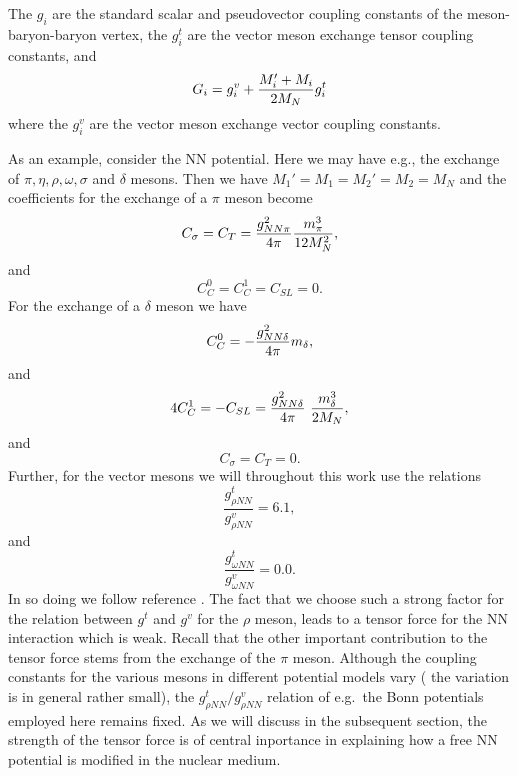 The $g_i$ are the standard scalar and pseudovector
coupling constants of the meson-baryon-baryon vertex, 
the $g^t_i$ are the vector meson exchange tensor
coupling constants, and
\begin{equation}
    G_i = g^v_i + {M'_i + M_i\over 2M_N} g^t_i 
\end{equation}
where the $g^v_i$ are the vector meson exchange vector coupling constants. 

As an example, consider the NN potential. Here we may have e.g., the
exchange of $\pi , \eta , \rho , \omega , \sigma$ and $\delta$ mesons.
Then we have $M_1'=M_1=M_2'=M_2=M_N$ and the coefficients for the
exchange of a $\pi$ meson become
\begin{equation}
   C_\sigma =C_T = {g_{NN\pi}^2\over 4\pi}\frac{m^3_{\pi}}{12M_N^2}, 
\end{equation}
and
\begin{equation}
     C^0_C = C^1_C = C_{SL} = 0.
\end{equation}
For the exchange of a $\delta$ meson we have
\begin{equation}
     C^0_C = - {g_{NN\delta}^2\over 4\pi} m_\delta,
\end{equation}
and
\begin{equation}
    4C^1_C = - C_{SL} = {g_{NN\delta}^2\over 4\pi}\ {m^3_\delta\over 2M_N},
\end{equation}
and
\begin{equation}
     C_\sigma = C_T = 0.
\end{equation}
Further, for the vector mesons we will throughout this work use the
relations
\begin{equation}
     \frac{g_{\rho NN}^t}{g_{\rho NN}^v} =6.1,
\end{equation}
and
\begin{equation}
    \frac{g_{\omega NN}^t}{g_{\omega NN}^v} =0.0.
\end{equation}
In so doing we follow reference \cite{mac89}. The fact that we choose such
a strong factor for the relation between $g^t$ and $g^v$ for the
$\rho$ meson, leads to a tensor force for the NN interaction which is weak.
Recall that the other important contribution to the tensor force
stems from the exchange of the $\pi$ meson. Although the coupling constants
for the various mesons in different potential models vary ( the variation
is in general rather small), the 
$g_{\rho NN}^t/g_{\rho NN}^v$ relation of e.g.\ the Bonn potentials
\cite{mac89} employed here remains fixed. As we will discuss in the
subsequent section, the strength of the tensor force is of central
inportance in explaining how a free NN potential is modified in the
nuclear medium.

